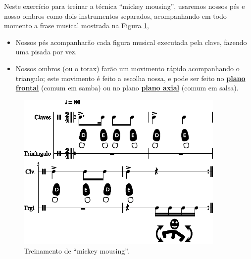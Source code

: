 \begin{example}
\label{ex:mickeymousing-1}
Neste exercício para treinar a técnica ``mickey mousing'', 
usaremos nossos pés e nosso ombros como dois instrumentos separados,
acompanhando em todo momento a frase musical mostrada na Figura \ref{fig:mickey-mousing-1-1},
\begin{itemize}
\item Nossos pés acompanharão cada figura musical executada pela clave, 
fazendo uma pisada por vez.
\item Nossos ombros (ou o torax) farão um movimento rápido acompanhando o triangulo;
este movimento é feito a escolha nossa, 
e pode ser feito no \hyperref[def:PlanoFrontal]{\textbf{plano frontal}} (comum em samba) ou 
no plano \hyperref[def:PlanoAxial]{\textbf{plano axial}} (comum em salsa).
\end{itemize}
\end{example}
\begin{figure}[h!]
    \centering
    \includegraphics[width=0.9\textwidth]{chapters/cap-musicalidade-tecnica/mickey-mousing-1-1.eps}
    \caption{Treinamento de ``mickey mousing''.}
    \label{fig:mickey-mousing-1-1}
\end{figure}

